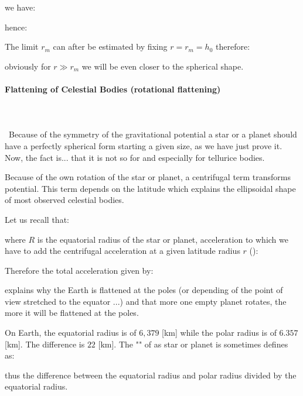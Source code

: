 	we have:
	
	hence:
	
	The limit $r_m$ can after be estimated by fixing $r=r_m=h_0$ therefore:
	
	obviously for $r\gg r_m$ we will be even closer to the spherical shape.

	\paragraph{Flattening of Celestial Bodies (rotational flattening)}\mbox{}\\\\\
	Because of the symmetry of the gravitational potential a star or a planet should have a perfectly spherical form starting a given size, as we have just prove it. Now, the fact is... that it is not so for and especially for tellurice bodies.
	
	Because of the own rotation of the star or planet, a centrifugal term transforms potential. This term depends on the latitude which explains the ellipsoidal shape of most observed celestial bodies.
	
	Let us recall that:
	
	where $R$ is the equatorial radius of the star or planet, acceleration to which we have to add the centrifugal acceleration at a given latitude radius $r$ ():
	
	Therefore the total acceleration given by:
	
	explains why the Earth is flattened at the poles (or depending of the point of view stretched to the equator ...) and that more one empty planet rotates, the more it will be flattened at the poles.
	
	On Earth, the equatorial radius is of $6,379$ [km] while the polar radius is of $6.357$ [km]. The difference is $22$ [km]. The "" of as star or planet is sometimes defines as:
	
	thus the difference between the equatorial radius and polar radius divided by the equatorial radius.
	
